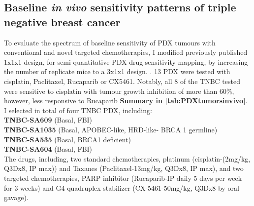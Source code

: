 \subsection{Baseline \textit{in vivo} sensitivity patterns of triple negative breast cancer}
To evaluate the spectrum of baseline sensitivity of PDX tumours with conventional and novel targeted chemotherapies, I modified previously published 1x1x1 design, for semi-quantitative PDX drug sensitivity mapping, by increasing the number of replicate mice to a 3x1x1 design. \cite{gao2015high, migliardi2012inhibition}. 
 13 PDX were tested with cisplatin, Paclitaxel, Rucaparib or CX5461. Notably, all 8 of the TNBC tested were sensitive to cisplatin with tumour growth inhibition of more than 60\%, however, less responsive to Rucaparib \textbf{Summary in \autoref{tab:PDXtumorsinvivo}}. 
I selected in total of four 
TNBC PDX, including: 
\\
\textbf{TNBC-SA609} (Basal, FBI)
\\
\textbf{TNBC-SA1035} (Basal, APOBEC-like, HRD-like- BRCA 1 germline)
\\
\textbf{TNBC-SA535} (Basal, BRCA1 deficient)
\\
\textbf{TNBC-SA604} (Basal, FBI)
\\
 The drugs, including, two standard chemotherapies, platinum (cisplatin-(2mg/kg, \ac{Q3Dx8}, \ac{IP} max)) and Taxanes (Paclitaxel-13mg/kg, \ac{Q3Dx8}, \ac{IP} max), and two targeted chemotherapies, PARP inhibitor (Rucaparib-\ac{IP} daily 5 days per week for 3 weeks) and G4 quadruplex stabilizer (CX-5461-50mg/kg, \ac{Q3Dx8} by oral gavage). 



